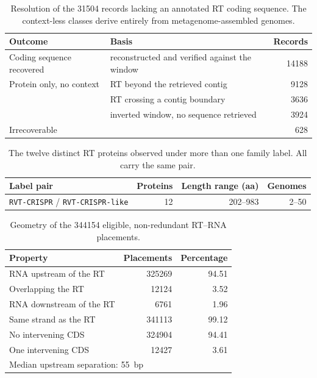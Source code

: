 \begin{table}[htbp]
\centering
\caption[Records lacking an annotated RT coding sequence]{Resolution of the \num{31504} records
lacking an annotated RT coding sequence. The context-less classes derive entirely from
metagenome-assembled genomes.}
\label{tab:recovery}
\begin{tabular}{llr}
\toprule
Outcome & Basis & Records \\
\midrule
Coding sequence recovered   & reconstructed and verified against the window & \num{14188} \\
Protein only, no context    & RT beyond the retrieved contig                & \num{9128}  \\
                            & RT crossing a contig boundary                 & \num{3636}  \\
                            & inverted window, no sequence retrieved        & \num{3924}  \\
Irrecoverable               &                                               & 628 \\
\bottomrule
\end{tabular}
\end{table}

\begin{table}[htbp]
\centering
\caption[Proteins observed under more than one family label]{The twelve distinct RT proteins
observed under more than one family label. All carry the same pair.}
\label{tab:crosslabel}
\begin{tabular}{lrrr}
\toprule
Label pair & Proteins & Length range (aa) & Genomes \\
\midrule
\texttt{RVT-CRISPR} / \texttt{RVT-CRISPR-like} & 12 & 202--983 & 2--50 \\
\bottomrule
\end{tabular}
\end{table}

\begin{table}[htbp]
\centering
\caption[Geometry of eligible non-redundant placements]{Geometry of the \num{344154} eligible,
non-redundant RT--RNA placements.}
\label{tab:geometry}
\begin{tabular}{lrr}
\toprule
Property & Placements & Percentage \\
\midrule
RNA upstream of the RT   & \num{325269} & 94.51 \\
Overlapping the RT       & \num{12124}  & 3.52 \\
RNA downstream of the RT & \num{6761}   & 1.96 \\
\midrule
Same strand as the RT    & \num{341113} & 99.12 \\
No intervening CDS       & \num{324904} & 94.41 \\
One intervening CDS      & \num{12427}  & 3.61 \\
\midrule
\multicolumn{3}{l}{Median upstream separation: 55~bp} \\
\bottomrule
\end{tabular}
\end{table}

